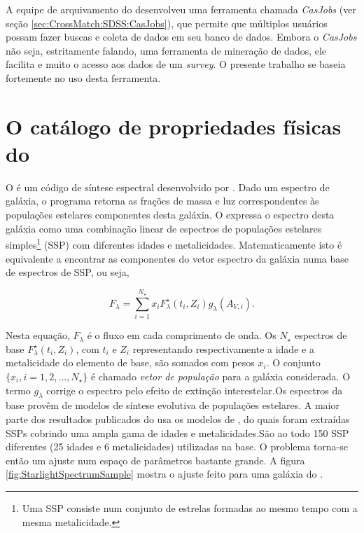 A equipe de arquivamento do \SDSS desenvolveu uma ferramenta chamada {\em
CasJobs} (ver seção \ref{sec:CrossMatch:SDSS:CasJobs}), que permite que
múltiplos usuários possam fazer buscas e coleta de dados em seu banco de dados.
Embora o {\em CasJobs} não seja, estritamente falando, uma ferramenta de
mineração de dados, ele facilita e muito o acesso aos dados de um {\em survey}.
O presente trabalho se baseia fortemente no uso desta ferramenta.



\section{O catálogo de propriedades físicas do \STARLIGHT}
\label{sec:Intro:Starlight}

O \starlight é um código de síntese espectral desenvolvido por
\citet{CidFernandes2005}. Dado um espectro de galáxia, o programa retorna as
frações de massa e luz correspondentes às populações estelares componentes desta
galáxia. O \starlight expressa o espectro desta galáxia como uma combinação
linear de espectros de populações estelares simples\footnote{Uma SSP consiste
num conjunto de estrelas formadas ao mesmo tempo com a mesma metalicidade.}
(SSP) com diferentes idades e metalicidades. Matematicamente isto é equivalente
a encontrar as componentes do vetor espectro da galáxia numa base de espectros
de SSP, ou seja,

\begin{equation*}
F_\lambda = \sum_{i=1}^{N_\star} x_i F^\star_\lambda(t_i,Z_i)
g_\lambda(A_{V,i}).
\end{equation*}

Nesta equação, $F_\lambda$ é o fluxo em cada comprimento de onda. Os $N_\star$
espectros de base $F^\star_\lambda(t_i, Z_i)$, com $t_i$ e $Z_i$ representando
respectivamente a idade e a metalicidade do elemento de base, são somados com
pesos $x_i$. O conjunto $\{x_i, i=1,2,\ldots,N_\star\}$ é chamado {\em vetor de
população} para a galáxia considerada. O termo $g_\lambda$ corrige o espectro
pelo efeito de extinção interestelar.Os espectros da base provêm de modelos de
síntese evolutiva de populações estelares. A maior parte dos resultados
publicados do \starlight usa os modelos de \citet[BC03]{Bruzual2003}, do quais
foram extraídas SSPs cobrindo uma ampla gama de idades e metalicidades.São ao
todo 150 SSP diferentes (25 idades e 6 metalicidades) utilizadas na base. O
problema torna-se então um ajuste num espaço de parâmetros bastante grande. A
figura \ref{fig:StarlightSpectrumSample} mostra o ajuste feito para uma galáxia
do \SDSS.

